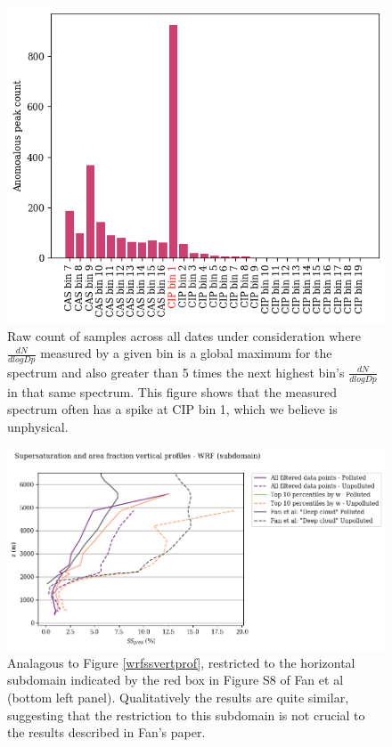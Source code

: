 \documentclass{article}
\begin{document}
\begin{figure}[ht]
	\centering
	\includegraphics[width=\textwidth]{halo/v2_anomalous_spectrum_counts_figure.png}
	\caption{Raw count of samples across all dates under consideration where $\frac{dN}{dlogDp}$ measured by a given bin is a global maximum for the spectrum and also greater than 5 times the next highest bin's $\frac{dN}{dlogDp}$ in that same spectrum. This figure shows that the measured spectrum often has a spike at CIP bin 1, which we believe is unphysical.}
	\label{cipbin1anom}
\end{figure}

\begin{figure}[ht]
	\centering
	\includegraphics[width=\textwidth]{wrf/single_panel_subdom_ss_pred_vs_z_figure.png}
	\caption{Analagous to Figure \ref{wrfssvertprof}, restricted to the horizontal subdomain indicated by the red box in Figure S8 of Fan et al (bottom left panel). Qualitatively the results are quite similar, suggesting that the restriction to this subdomain is not crucial to the results described in Fan's paper.}
	\label{wrfsubdomssvertprof}
\end{figure}
\end{document}
